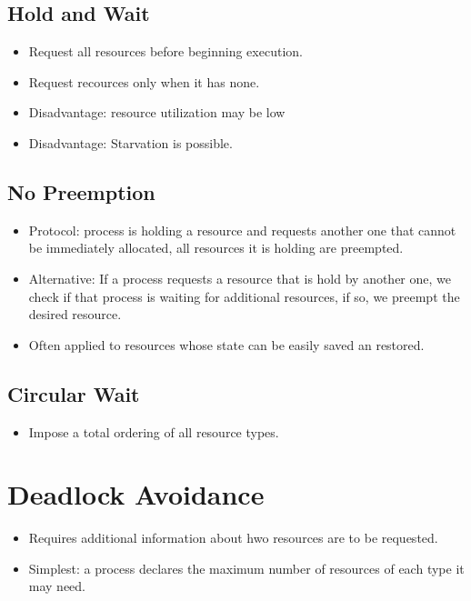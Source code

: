 \documentclass[10pt]{report}
\begin{document}
		\subsection{Hold and Wait}
			\begin{itemize}
				\item Request all resources before beginning execution.
				\item Request recources only when it has none.
				\item Disadvantage: resource utilization may be low
				\item Disadvantage: Starvation is possible.
			\end{itemize}

		\subsection{No Preemption}
			\begin{itemize}
				\item Protocol: process is holding a resource and requests another one that cannot be immediately allocated, all resources it is holding are preempted.
				\item Alternative: If a process requests a resource that is hold by another one, we check if that process is waiting for additional resources, if so, we preempt the desired resource.
				\item Often applied to resources whose state can be easily saved an restored.
			\end{itemize}

		\subsection{Circular Wait}
			\begin{itemize}
				\item Impose a total ordering of all resource types.
			\end{itemize}

	\section{Deadlock Avoidance}
		\begin{itemize}
			\item Requires additional information about hwo resources are to be requested.
			\item Simplest: a process declares the maximum number of resources of each type it may need.
		\end{itemize}
\end{document}
